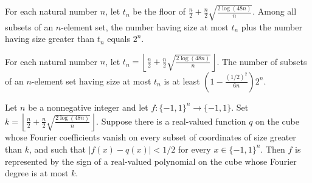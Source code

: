 \begin{theorem}
\label{FABL.card_lowDegreeFourierFamily_add_ncard_high}
\leanok
{}
For each natural number $n$, let $t_n$ be the floor of $\frac n2+\frac
n2\sqrt{\frac{2\log(48n)}{n}}$. Among all subsets of an $n$-element set, the number
having size at most $t_n$ plus the number having size greater than $t_n$ equals $2^n$.
\end{theorem}

\begin{theorem}
\label{FABL.card_lowDegreeFourierFamily_typicalPolynomialThresholdCutoff}
\leanok
{}
For each natural number $n$, let $t_n=\left\lfloor\frac n2+\frac
n2\sqrt{\frac{2\log(48n)}{n}}\right\rfloor$. The number of subsets of an $n$-element set
having size at most $t_n$ is at least $\left(1-\frac{(1/2)^2}{6n}\right)2^n$.
\end{theorem}

\begin{theorem}
\label{FABL.isPolynomialThreshold_of_hasLowDegreeUniformApproximation}
\leanok
{}
Let $n$ be a nonnegative integer and let $f:\{-1,1\}^n\to\{-1,1\}$. Set $k=\left\lfloor
\frac n2+\frac n2\sqrt{\frac{2\log(48n)}{n}}\right\rfloor$. Suppose there is a
real-valued function $q$ on the cube whose Fourier coefficients vanish on every subset
of coordinates of size greater than $k$, and such that $|f(x)-q(x)|<1/2$ for every
$x\in\{-1,1\}^n$. Then $f$ is represented by the sign of a real-valued polynomial on the
cube whose Fourier degree is at most $k$.
\end{theorem}

